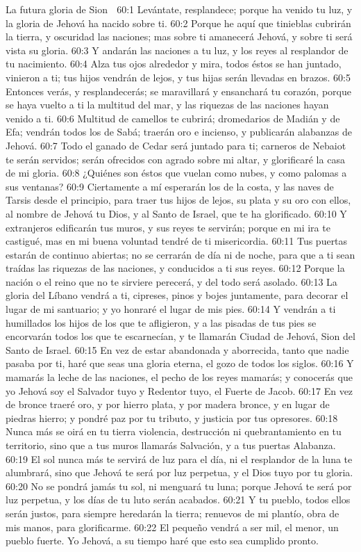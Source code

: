 La futura gloria de Sion  

60:1 Levántate, resplandece; porque ha venido tu luz, y la gloria de Jehová ha nacido sobre ti.  
60:2 Porque he aquí que tinieblas cubrirán la tierra, y oscuridad las naciones; mas sobre ti amanecerá Jehová, y sobre ti será vista su gloria.  
60:3 Y andarán las naciones a tu luz, y los reyes al resplandor de tu nacimiento.  
60:4 Alza tus ojos alrededor y mira, todos éstos se han juntado, vinieron a ti; tus hijos vendrán de lejos, y tus hijas serán llevadas en brazos.  
60:5 Entonces verás, y resplandecerás; se maravillará y ensanchará tu corazón, porque se haya vuelto a ti la multitud del mar, y las riquezas de las naciones hayan venido a ti.  
60:6 Multitud de camellos te cubrirá; dromedarios de Madián y de Efa; vendrán todos los de Sabá; traerán oro e incienso, y publicarán alabanzas de Jehová.  
60:7 Todo el ganado de Cedar será juntado para ti; carneros de Nebaiot te serán servidos; serán ofrecidos con agrado sobre mi altar, y glorificaré la casa de mi gloria.  
60:8 ¿Quiénes son éstos que vuelan como nubes, y como palomas a sus ventanas?  
60:9 Ciertamente a mí esperarán los de la costa, y las naves de Tarsis desde el principio, para traer tus hijos de lejos, su plata y su oro con ellos, al nombre de Jehová tu Dios, y al Santo de Israel, que te ha glorificado.  
60:10 Y extranjeros edificarán tus muros, y sus reyes te servirán; porque en mi ira te castigué, mas en mi buena voluntad tendré de ti misericordia.  
60:11 Tus puertas estarán de continuo abiertas; no se cerrarán de día ni de noche, para que a ti sean traídas las riquezas de las naciones, y conducidos a ti sus reyes.  
60:12 Porque la nación o el reino que no te sirviere perecerá, y del todo será asolado. 
60:13 La gloria del Líbano vendrá a ti, cipreses, pinos y bojes juntamente, para decorar el lugar de mi santuario; y yo honraré el lugar de mis pies.  
60:14 Y vendrán a ti humillados los hijos de los que te afligieron, y a las pisadas de tus pies se encorvarán todos los que te escarnecían, y te llamarán Ciudad de Jehová, Sion del Santo de Israel.  
60:15 En vez de estar abandonada y aborrecida, tanto que nadie pasaba por ti, haré que seas una gloria eterna, el gozo de todos los siglos.  
60:16 Y mamarás la leche de las naciones, el pecho de los reyes mamarás; y conocerás que yo Jehová soy el Salvador tuyo y Redentor tuyo, el Fuerte de Jacob.  
60:17 En vez de bronce traeré oro, y por hierro plata, y por madera bronce, y en lugar de piedras hierro; y pondré paz por tu tributo, y justicia por tus opresores.  
60:18 Nunca más se oirá en tu tierra violencia, destrucción ni quebrantamiento en tu territorio, sino que a tus muros llamarás Salvación, y a tus puertas Alabanza.  
60:19 El sol nunca más te servirá de luz para el día, ni el resplandor de la luna te alumbrará, sino que Jehová te será por luz perpetua, y el Dios tuyo por tu gloria. 
60:20 No se pondrá jamás tu sol, ni menguará tu luna; porque Jehová te será por luz perpetua, y los días de tu luto serán acabados.  
60:21 Y tu pueblo, todos ellos serán justos, para siempre heredarán la tierra; renuevos de mi plantío, obra de mis manos, para glorificarme.  
60:22 El pequeño vendrá a ser mil, el menor, un pueblo fuerte. Yo Jehová, a su tiempo haré que esto sea cumplido pronto.  

